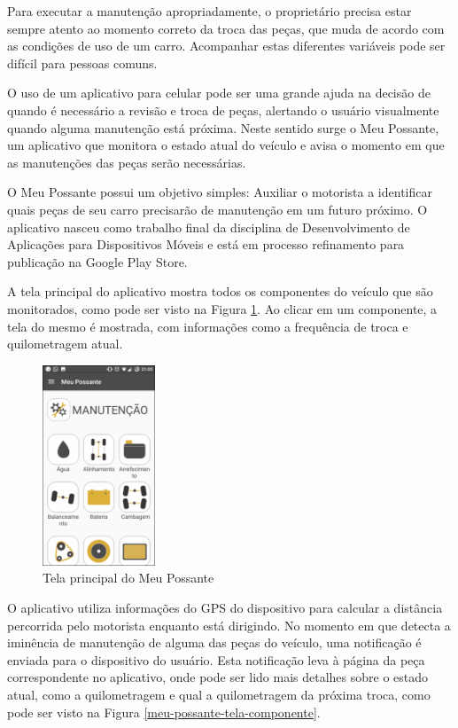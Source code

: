 Para executar a manutenção apropriadamente, o proprietário precisa estar
sempre atento ao momento correto da troca das peças, que muda de acordo
com as condições de uso de um carro. Acompanhar estas diferentes variáveis pode
ser difícil para pessoas comuns.

O uso de um aplicativo para celular pode ser uma grande ajuda na decisão de quando
é necessário a revisão e troca de peças, alertando o usuário visualmente quando alguma
manutenção está próxima. Neste sentido surge o Meu Possante, um aplicativo que monitora
o estado atual do veículo e avisa o momento em que as manutenções das peças serão
necessárias.

O Meu Possante possui um objetivo simples: Auxiliar o motorista a identificar quais
peças de seu carro precisarão de manutenção em um futuro próximo. O aplicativo nasceu
como trabalho final da disciplina de Desenvolvimento de Aplicações para Dispositivos
Móveis e está em processo refinamento para publicação na Google Play Store.

A tela principal do aplicativo mostra todos os componentes do veículo que são monitorados,
como pode ser visto na Figura \ref{meu-possante-tela-principal}. Ao clicar em um componente,
a tela do mesmo é mostrada, com informações como a frequência de troca e quilometragem
atual.

\begin{figure}[h]
\centering
\includegraphics[width=0.3\textwidth]{images/meu-possante-tela-principal.png}
\caption{Tela principal do Meu Possante}
\label{meu-possante-tela-principal}
\end{figure}

O aplicativo utiliza informações do GPS do dispositivo para calcular a distância percorrida
pelo motorista enquanto está dirigindo. No momento em que detecta a iminência de manutenção
de alguma das peças do veículo, uma notificação é enviada para o dispositivo do usuário.
Esta notificação leva à página da peça correspondente no aplicativo, onde pode ser lido
mais detalhes sobre o estado atual, como a quilometragem e qual a quilometragem da
próxima troca, como pode ser visto na Figura \ref{meu-possante-tela-componente}.

